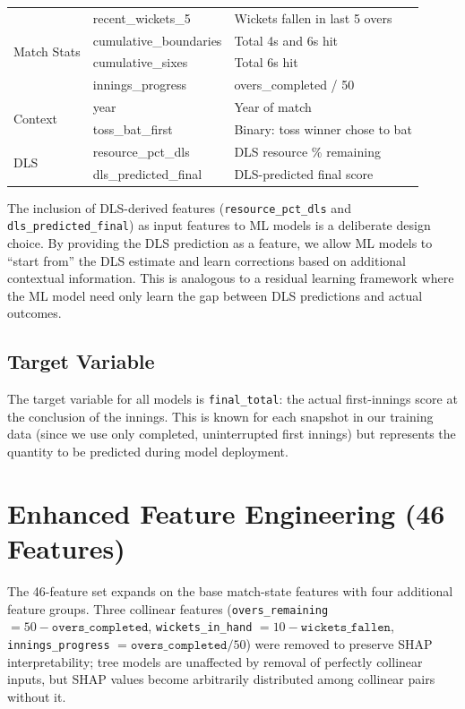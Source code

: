 \documentclass[12pt,a4paper,oneside]{report}
\begin{document}
\begin{table}[htbp]
\begin{tabular}{llp{7cm}}
\midrule
\multirow{4}{*}{Match Stats} & recent\_wickets\_5 & Wickets fallen in last 5 overs \\
 & cumulative\_boundaries & Total 4s and 6s hit \\
 & cumulative\_sixes & Total 6s hit \\
 & innings\_progress & overs\_completed / 50 \\
\midrule
\multirow{2}{*}{Context} & year & Year of match \\
 & toss\_bat\_first & Binary: toss winner chose to bat \\
\midrule
\multirow{2}{*}{DLS} & resource\_pct\_dls & DLS resource \% remaining \\
 & dls\_predicted\_final & DLS-predicted final score \\
\bottomrule
\end{tabular}
\end{table}

The inclusion of DLS-derived features (\texttt{resource\_pct\_dls} and \texttt{dls\_predicted\_final}) as input features to ML models is a deliberate design choice. By providing the DLS prediction as a feature, we allow ML models to ``start from'' the DLS estimate and learn corrections based on additional contextual information. This is analogous to a residual learning framework where the ML model need only learn the gap between DLS predictions and actual outcomes.

\subsection{Target Variable}

The target variable for all models is \texttt{final\_total}: the actual first-innings score at the conclusion of the innings. This is known for each snapshot in our training data (since we use only completed, uninterrupted first innings) but represents the quantity to be predicted during model deployment.

\section{Enhanced Feature Engineering (46 Features)}
\label{sec:features_v2}

The 46-feature set expands on the base match-state features with four additional feature groups.  Three collinear features (\texttt{overs\_remaining} $= 50 - \texttt{overs\_completed}$, \texttt{wickets\_in\_hand} $= 10 - \texttt{wickets\_fallen}$, \texttt{innings\_progress} $= \texttt{overs\_completed}/50$) were removed to preserve SHAP interpretability; tree models are unaffected by removal of perfectly collinear inputs, but SHAP values become arbitrarily distributed among collinear pairs without it.
\end{document}
